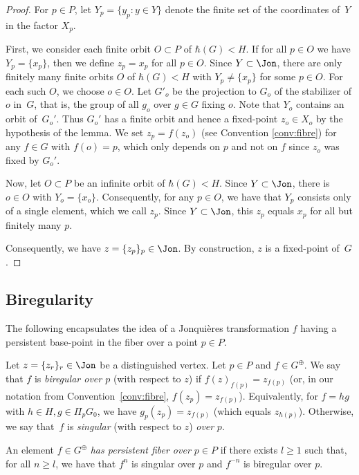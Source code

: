 \begin{proof}
{
For $p\in P$, let $Y_p=\{y_p \colon y\in Y\}$ denote the finite set of the coordinates of~$Y$ in the factor $X_p$.}

{First, we consider each finite orbit $O\subset P$ of $\hbar(G)<H$. If for all $p\in O$ we have $Y_p=\{x_p\}$, then we define $z_p=x_p$ for all $p\in O$.
Since $Y\subset \Jon$, there are only finitely many finite orbits $O$ of $\hbar(G)<H$ with $Y_p\neq \{x_p\}$ for some $p\in O$. For each such $O$, we choose $o\in O$. Let $G'_o$ be the projection to $G_o$ of the stabilizer of $o$ in~$G$, that is, the group of all $g_o$ over $g\in G$ fixing $o$. Note that $Y_o$ contains an orbit of~$G_o'$. Thus $G_o'$ has a finite orbit and hence a fixed-point $z_o\in X_o$ by the hypothesis of the lemma. We set $z_p=f(z_o)$ (see Convention \ref{conv:fibre}) for any $f\in G$ with $f(o)=p$, which only depends on $p$ and not on $f$ since $z_o$ was fixed by $G_o'$. }

{Now, let $O\subset P$ be an infinite orbit of $\hbar(G)<H$. Since $Y\subset \Jon$, there is $o\in O$ with $Y_o=\{x_o\}$. Consequently, for any $p\in O$, we have that $Y_p$ consists only of a single element, which we call $z_p$.
Since $Y\subset \Jon$, this $z_p$ equals $x_p$ for all but finitely many $p$.}

{Consequently, we have $z=\{z_p\}_p\in \Jon$. By construction, $z$ is a fixed-point of~$G$.}
\end{proof}

\subsection{Biregularity}

The following encapsulates the idea of a Jonquières transformation $f$ having a persistent base-point in the fiber over a point $p\in P$.

\begin{definition}
\label{def:pers} Let $z=\{z_r\}_r\in \Jon$ be a distinguished vertex. Let $p\in P$ and $f\in G^\oplus$. We say that $f$ is \emph{biregular over $p$} (with respect to $z$) if $f(z)_{f(p)}=z_{f(p)}$ (or, in our notation from Convention~\ref{conv:fibre}, $f(z_p)=z_{f(p)}$). Equivalently, for $f=hg$ with $h\in H, g\in \Pi_pG_0$, we have $g_p(z_p)=z_{f(p)}$ (which equals $z_{h(p)}$). Otherwise, we say that~$f$ is \emph{singular} (with respect to $z$) \emph{over} $p$.

An element $f\in G^\oplus$ \emph{has persistent fiber over $p\in P$} if there exists $l\geq 1$ such that, for all $n\geq l$, we have that $f^n$ is singular over $p$ and $f^{-n}$ is biregular over $p$.
\end{definition}

